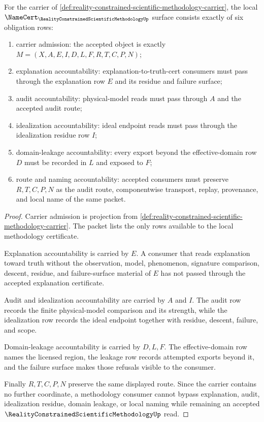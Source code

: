 \begin{theorem}
\label{thm:reality-constrained-scientific-methodology-obligation-surface}
For the carrier of \autoref{def:reality-constrained-scientific-methodology-carrier}, the local $\NameCert_{\RealityConstrainedScientificMethodologyUp}$ surface consists exactly of six obligation rows:
\begin{enumerate}
\item carrier admission: the accepted object is exactly $M=(X,A,E,I,D,L,F,R,T,C,P,N)$;
\item explanation accountability: explanation-to-truth-cert consumers must pass through the explanation row $E$ and its residue and failure surface;
\item audit accountability: physical-model reads must pass through $A$ and the accepted audit route;
\item idealization accountability: ideal endpoint reads must pass through the idealization residue row $I$;
\item domain-leakage accountability: every export beyond the effective-domain row $D$ must be recorded in $L$ and exposed to $F$;
\item route and naming accountability: accepted consumers must preserve $R,T,C,P,N$ as the audit route, componentwise transport, replay, provenance, and local name of the same packet.
\end{enumerate}
\end{theorem}
\begin{proof}
Carrier admission is projection from \autoref{def:reality-constrained-scientific-methodology-carrier}. The packet lists the only rows available to the local methodology certificate.

Explanation accountability is carried by $E$. A consumer that reads explanation toward truth without the observation, model, phenomenon, signature comparison, descent, residue, and failure-surface material of $E$ has not passed through the accepted explanation certificate.

Audit and idealization accountability are carried by $A$ and $I$. The audit row records the finite physical-model comparison and its strength, while the idealization row records the ideal endpoint together with residue, descent, failure, and scope.

Domain-leakage accountability is carried by $D,L,F$. The effective-domain row names the licensed region, the leakage row records attempted exports beyond it, and the failure surface makes those refusals visible to the consumer.

Finally $R,T,C,P,N$ preserve the same displayed route. Since the carrier contains no further coordinate, a methodology consumer cannot bypass explanation, audit, idealization residue, domain leakage, or local naming while remaining an accepted $\RealityConstrainedScientificMethodologyUp$ read.
\end{proof}

